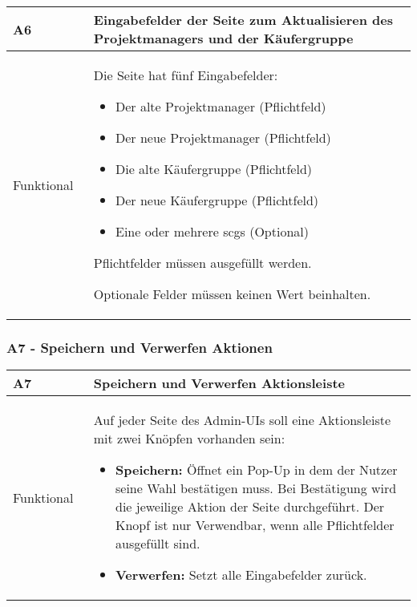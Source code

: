 \begin{center}
    \begin{tabular}{ |p{0.2\linewidth}|p{0.8\linewidth}| } 
        \hline
        \rowcolor{lightgray}
        \textbf{A6} & \textbf{Eingabefelder der Seite zum Aktualisieren des Projektmanagers und der Käufergruppe} \\
        \hline
        Funktional & Die Seite hat fünf Eingabefelder:
        \begin{itemize}
            \item Der alte Projektmanager (Pflichtfeld)
            \item Der neue Projektmanager (Pflichtfeld)
            \item Die alte Käufergruppe (Pflichtfeld)
            \item Der neue Käufergruppe (Pflichtfeld)
            \item Eine oder mehrere \acsp{scg} (Optional)
        \end{itemize} 
        Pflichtfelder müssen ausgefüllt werden.
       
        Optionale Felder müssen keinen Wert beinhalten.\\ 
        \hline
    \end{tabular}
\end{center}

\subsubsection[A7 - Speichern und Verwerfen Aktionen]{A7 - Speichern und Verwerfen Aktionen}

\begin{center}
    \begin{tabular}{ |p{0.2\linewidth}|p{0.8\linewidth}| } 
        \hline
        \rowcolor{lightgray}
        \textbf{A7} & \textbf{Speichern und Verwerfen Aktionsleiste} \\
        \hline
        Funktional &  Auf jeder Seite des Admin-UIs soll eine Aktionsleiste mit zwei Knöpfen vorhanden sein:
        \begin{itemize}
            \item \textbf{Speichern:} Öffnet ein Pop-Up in dem der Nutzer seine Wahl bestätigen muss. Bei Bestätigung wird die jeweilige Aktion der Seite durchgeführt. Der Knopf ist nur Verwendbar, wenn alle Pflichtfelder ausgefüllt sind.
            \item \textbf{Verwerfen:} Setzt alle Eingabefelder zurück.
        \end{itemize}\\
        \hline
    \end{tabular}
\end{center}

